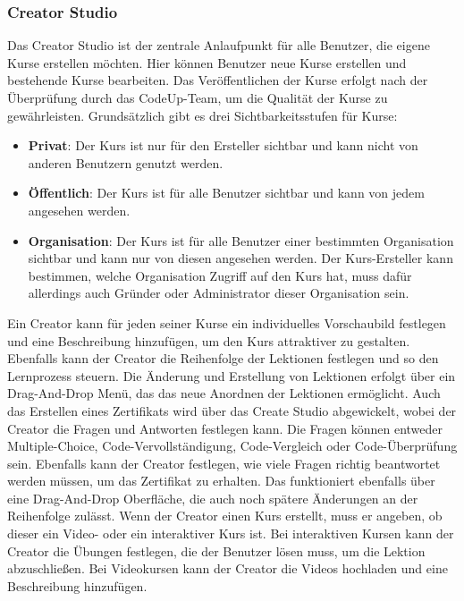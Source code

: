 \documentclass[main.tex]{subfiles}
\begin{document}
    \subsubsection{Creator Studio}
    Das Creator Studio ist der zentrale Anlaufpunkt für alle Benutzer, die eigene Kurse erstellen möchten.
    Hier können Benutzer neue Kurse erstellen und bestehende Kurse bearbeiten.
    Das Veröffentlichen der Kurse erfolgt nach der Überprüfung durch das CodeUp-Team, um die Qualität der Kurse zu gewährleisten.
    Grundsätzlich gibt es drei Sichtbarkeitsstufen für Kurse:
    \begin{itemize}
        \item \textbf{Privat}: Der Kurs ist nur für den Ersteller sichtbar und kann nicht von anderen Benutzern genutzt werden.
        \item \textbf{Öffentlich}: Der Kurs ist für alle Benutzer sichtbar und kann von jedem angesehen werden.
        \item \textbf{Organisation}: Der Kurs ist für alle Benutzer einer bestimmten Organisation sichtbar und kann nur von diesen angesehen werden.
        Der Kurs-Ersteller kann bestimmen, welche Organisation Zugriff auf den Kurs hat, muss dafür allerdings auch Gründer oder Administrator dieser Organisation sein.
    \end{itemize}
    Ein Creator kann für jeden seiner Kurse ein individuelles Vorschaubild festlegen und eine Beschreibung hinzufügen, um den Kurs attraktiver zu gestalten.
    Ebenfalls kann der Creator die Reihenfolge der Lektionen festlegen und so den Lernprozess steuern.
    Die Änderung und Erstellung von Lektionen erfolgt über ein Drag-And-Drop Menü, das das neue Anordnen der Lektionen ermöglicht.
    Auch das Erstellen eines Zertifikats wird über das Create Studio abgewickelt, wobei der Creator die Fragen und Antworten festlegen kann.
    Die Fragen können entweder Multiple-Choice, Code-Vervollständigung, Code-Vergleich oder Code-Überprüfung sein.
    Ebenfalls kann der Creator festlegen, wie viele Fragen richtig beantwortet werden müssen, um das Zertifikat zu erhalten.
    Das funktioniert ebenfalls über eine Drag-And-Drop Oberfläche, die auch noch spätere Änderungen an der Reihenfolge zulässt.
    Wenn der Creator einen Kurs erstellt, muss er angeben, ob dieser ein Video- oder ein interaktiver Kurs ist.
    Bei interaktiven Kursen kann der Creator die Übungen festlegen, die der Benutzer lösen muss, um die Lektion abzuschließen.
    Bei Videokursen kann der Creator die Videos hochladen und eine Beschreibung hinzufügen.
\end{document}
